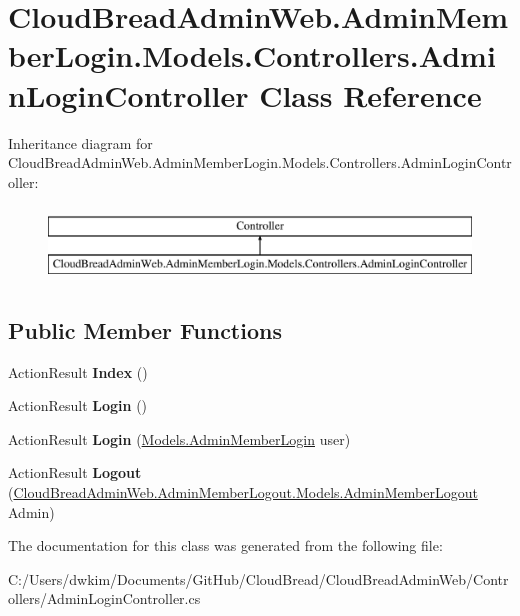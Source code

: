 \hypertarget{a00009}{}\section{Cloud\+Bread\+Admin\+Web.\+Admin\+Member\+Login.\+Models.\+Controllers.\+Admin\+Login\+Controller Class Reference}
\label{a00009}
Inheritance diagram for Cloud\+Bread\+Admin\+Web.\+Admin\+Member\+Login.\+Models.\+Controllers.\+Admin\+Login\+Controller\+:\begin{figure}[H]
\begin{center}
\leavevmode
\includegraphics[height=2.000000cm]{a00009}
\end{center}
\end{figure}
\subsection*{Public Member Functions}
\begin{DoxyCompactItemize}
\item 
Action\+Result {\bfseries Index} ()\hypertarget{a00009_a6a86ef816be4f0469f4a305f5dd6ecf2}{}\label{a00009_a6a86ef816be4f0469f4a305f5dd6ecf2}

\item 
Action\+Result {\bfseries Login} ()\hypertarget{a00009_a2bc2253d4535bb67490f8b5cc1ee84b7}{}\label{a00009_a2bc2253d4535bb67490f8b5cc1ee84b7}

\item 
Action\+Result {\bfseries Login} (\hyperlink{a00010}{Models.\+Admin\+Member\+Login} user)\hypertarget{a00009_a635757af63e9798fd3db50b278876d1e}{}\label{a00009_a635757af63e9798fd3db50b278876d1e}

\item 
Action\+Result {\bfseries Logout} (\hyperlink{a00011}{Cloud\+Bread\+Admin\+Web.\+Admin\+Member\+Logout.\+Models.\+Admin\+Member\+Logout} Admin)\hypertarget{a00009_a4a8d0c87d51f509f1185c13223d623f4}{}\label{a00009_a4a8d0c87d51f509f1185c13223d623f4}

\end{DoxyCompactItemize}


The documentation for this class was generated from the following file\+:\begin{DoxyCompactItemize}
\item 
C\+:/\+Users/dwkim/\+Documents/\+Git\+Hub/\+Cloud\+Bread/\+Cloud\+Bread\+Admin\+Web/\+Controllers/Admin\+Login\+Controller.\+cs\end{DoxyCompactItemize}
